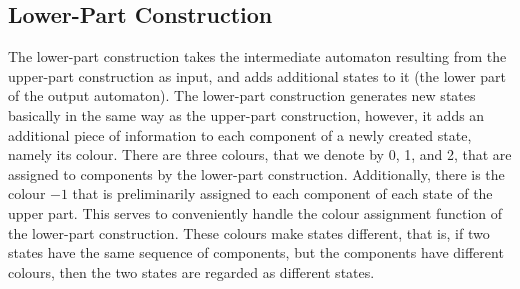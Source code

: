 





\subsection{Lower-Part Construction}
\label{3_lower_part}
The lower-part construction takes the intermediate automaton resulting from the upper-part construction as input, and adds additional states to it (the lower part of the output automaton). The lower-part construction generates new states basically in the same way as the upper-part construction, however, it adds an additional piece of information to each component of a newly created state, namely its colour. There are three colours, that we denote by 0, 1, and 2, that are assigned to components by the lower-part construction. Additionally, there is the colour $-1$ that is preliminarily assigned to each component of each state of the upper part. This serves to conveniently handle the colour assignment function of the lower-part construction. These colours make states different, that is, if two states have the same sequence of components, but the components have different colours, then the two states are regarded as different states.

